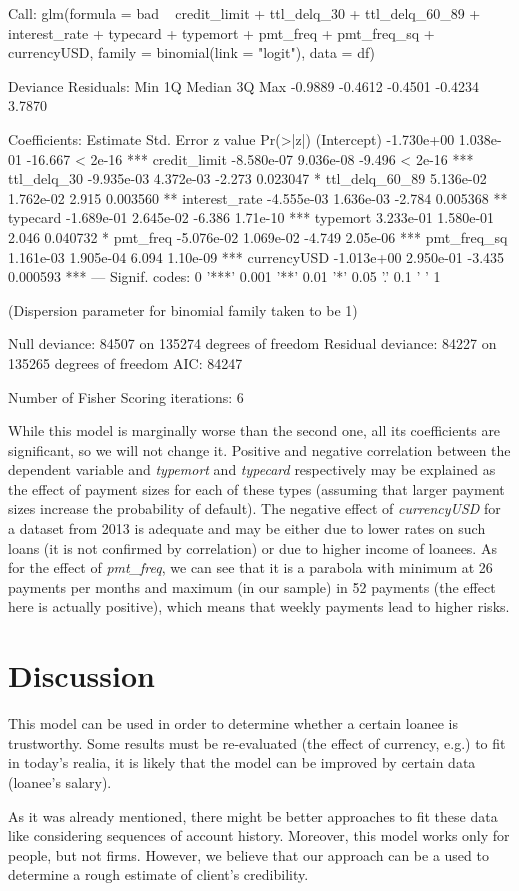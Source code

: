 \documentclass[12pt,a4paper]{article}
\begin{document}
\begin{Schunk}
\begin{Soutput}
Call:
glm(formula = bad ~ credit_limit + ttl_delq_30 + ttl_delq_60_89 + 
    interest_rate + typecard + typemort + pmt_freq + pmt_freq_sq + 
    currencyUSD, family = binomial(link = "logit"), data = df)

Deviance Residuals: 
    Min       1Q   Median       3Q      Max  
-0.9889  -0.4612  -0.4501  -0.4234   3.7870  

Coefficients:
                 Estimate Std. Error z value Pr(>|z|)    
(Intercept)    -1.730e+00  1.038e-01 -16.667  < 2e-16 ***
credit_limit   -8.580e-07  9.036e-08  -9.496  < 2e-16 ***
ttl_delq_30    -9.935e-03  4.372e-03  -2.273 0.023047 *  
ttl_delq_60_89  5.136e-02  1.762e-02   2.915 0.003560 ** 
interest_rate  -4.555e-03  1.636e-03  -2.784 0.005368 ** 
typecard       -1.689e-01  2.645e-02  -6.386 1.71e-10 ***
typemort        3.233e-01  1.580e-01   2.046 0.040732 *  
pmt_freq       -5.076e-02  1.069e-02  -4.749 2.05e-06 ***
pmt_freq_sq     1.161e-03  1.905e-04   6.094 1.10e-09 ***
currencyUSD    -1.013e+00  2.950e-01  -3.435 0.000593 ***
---
Signif. codes:  0 '***' 0.001 '**' 0.01 '*' 0.05 '.' 0.1 ' ' 1

(Dispersion parameter for binomial family taken to be 1)

    Null deviance: 84507  on 135274  degrees of freedom
Residual deviance: 84227  on 135265  degrees of freedom
AIC: 84247

Number of Fisher Scoring iterations: 6
\end{Soutput}
\end{Schunk}
While this model is marginally worse than the second one, all its coefficients are significant, so we will not change it. Positive and negative correlation between the dependent variable and \textit{typemort} and \textit{typecard} respectively may be explained as the effect of payment sizes for each of these types (assuming that larger payment sizes increase the probability of default). The negative effect of \textit{currencyUSD} for a dataset from 2013 is adequate and may be either due to lower rates on such loans (it is not confirmed by correlation) or due to higher income of loanees. As for the effect of \textit{pmt\_freq}, we can see that it is a parabola with minimum at 26 payments per months and maximum (in our sample) in 52 payments (the effect here is actually positive), which means that weekly payments lead to higher risks.
\section{Discussion}
This model can be used in order to determine whether a certain loanee is trustworthy. Some results must be re-evaluated (the effect of currency, e.g.) to fit in today's realia, it is likely that the model can be improved by certain data (loanee's salary).

As it was already mentioned, there might be better approaches to fit these data like considering sequences of account history. Moreover, this model works only for people, but not firms. However, we believe that our approach can be a used to determine a rough estimate of client's credibility. 
\end{document}
